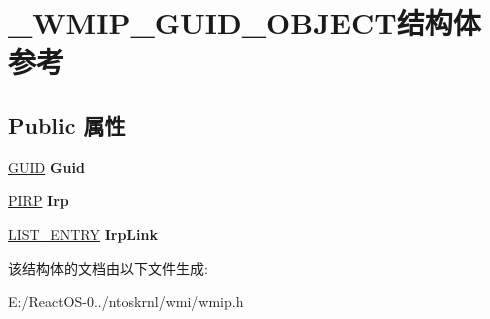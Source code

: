 \hypertarget{struct___w_m_i_p___g_u_i_d___o_b_j_e_c_t}{}\section{\+\_\+\+W\+M\+I\+P\+\_\+\+G\+U\+I\+D\+\_\+\+O\+B\+J\+E\+C\+T结构体 参考}
\label{struct___w_m_i_p___g_u_i_d___o_b_j_e_c_t}
\subsection*{Public 属性}
\begin{DoxyCompactItemize}
\item 
\mbox{\label{struct___w_m_i_p___g_u_i_d___o_b_j_e_c_t_a4006d14517dfc153a93bb82549856e23}} 
\hyperlink{interface_g_u_i_d}{G\+U\+ID} {\bfseries Guid}
\item 
\mbox{\label{struct___w_m_i_p___g_u_i_d___o_b_j_e_c_t_aa40811c1d63b6221b6fea8af35d730bb}} 
\hyperlink{interfacevoid}{P\+I\+RP} {\bfseries Irp}
\item 
\mbox{\label{struct___w_m_i_p___g_u_i_d___o_b_j_e_c_t_a3e8623324130c81733dba83b12a7a201}} 
\hyperlink{struct___l_i_s_t___e_n_t_r_y}{L\+I\+S\+T\+\_\+\+E\+N\+T\+RY} {\bfseries Irp\+Link}
\end{DoxyCompactItemize}


该结构体的文档由以下文件生成\+:\begin{DoxyCompactItemize}
\item 
E\+:/\+React\+O\+S-\/0../ntoskrnl/wmi/wmip.\+h\end{DoxyCompactItemize}
